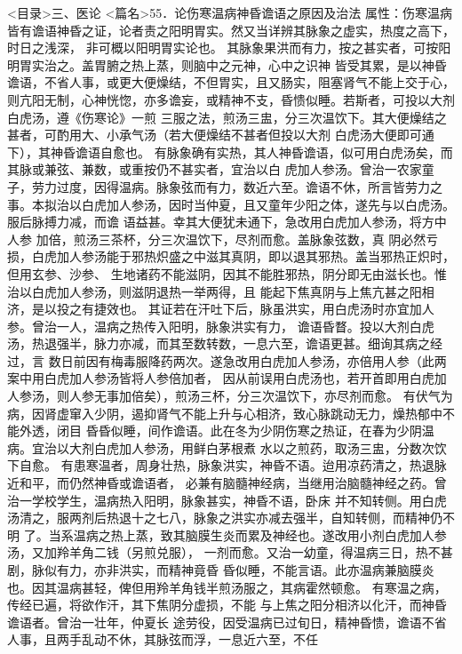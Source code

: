 \documentclass[a4paper,12pt,UTF8,twoside]{ctexbook}
\begin{document}
<目录>三、医论
<篇名>55．论伤寒温病神昏谵语之原因及治法
属性：伤寒温病皆有谵语神昏之证，论者责之阳明胃实。然又当详辨其脉象之虚实，热度之高下，时日之浅深， 
非可概以阳明胃实论也。 
其脉象果洪而有力，按之甚实者，可按阳明胃实治之。盖胃腑之热上蒸，则脑中之元神，心中之识神 
皆受其累，是以神昏谵语，不省人事，或更大便燥结，不但胃实，且又肠实，阻塞肾气不能上交于心， 
则亢阳无制，心神恍惚，亦多谵妄，或精神不支，昏愦似睡。若斯者，可投以大剂白虎汤，遵《伤寒论》一煎 
三服之法，煎汤三盅，分三次温饮下。其大便燥结之甚者，可酌用大、小承气汤（若大便燥结不甚者但投以大剂 
白虎汤大便即可通下），其神昏谵语自愈也。 
有脉象确有实热，其人神昏谵语，似可用白虎汤矣，而其脉或兼弦、兼数，或重按仍不甚实者，宜治以白 
虎加人参汤。曾治一农家童子，劳力过度，因得温病。脉象弦而有力，数近六至。谵语不休，所言皆劳力之 
事。本拟治以白虎加人参汤，因时当仲夏，且又童年少阳之体，遂先与以白虎汤。服后脉搏力减，而谵 
语益甚。幸其大便犹未通下，急改用白虎加人参汤，将方中人参 
加倍，煎汤三茶杯，分三次温饮下，尽剂而愈。盖脉象弦数，真 
阴必然亏损，白虎加人参汤能于邪热炽盛之中滋其真阴，即以退其邪热。盖当邪热正炽时，但用玄参、沙参、 
生地诸药不能滋阴，因其不能胜邪热，阴分即无由滋长也。惟治以白虎加人参汤，则滋阴退热一举两得，且 
能起下焦真阴与上焦亢甚之阳相济，是以投之有捷效也。 
其证若在汗吐下后，脉虽洪实，用白虎汤时亦宜加人参。曾治一人，温病之热传入阳明，脉象洪实有力， 
谵语昏瞀。投以大剂白虎汤，热退强半，脉力亦减，而其至数转数，一息六至，谵语更甚。细询其病之经过，言 
数日前因有梅毒服降药两次。遂急改用白虎加人参汤，亦倍用人参（此两案中用白虎加人参汤皆将人参倍加者， 
因从前误用白虎汤也，若开首即用白虎加人参汤，则人参无事加倍矣），煎汤三杯，分三次温饮下，亦尽剂而愈。 
有伏气为病，因肾虚窜入少阴，遏抑肾气不能上升与心相济，致心脉跳动无力，燥热郁中不能外透，闭目 
昏昏似睡，间作谵语。此在冬为少阴伤寒之热证，在春为少阴温病。宜治以大剂白虎加人参汤，用鲜白茅根煮 
水以之煎药，取汤三盅，分数次饮下自愈。 
有患寒温者，周身壮热，脉象洪实，神昏不语。迨用凉药清之，热退脉近和平，而仍然神昏或谵语者， 
必兼有脑髓神经病，当继用治脑髓神经之药。曾治一学校学生，温病热入阳明，脉象甚实，神昏不语，卧床 
并不知转侧。用白虎汤清之，服两剂后热退十之七八，脉象之洪实亦减去强半，自知转侧，而精神仍不明 
了。当系温病之热上蒸，致其脑膜生炎而累及神经也。遂改用小剂白虎加人参汤，又加羚羊角二钱（另煎兑服）， 
一剂而愈。又治一幼童，得温病三日，热不甚剧，脉似有力，亦非洪实，而精神竟昏 
昏似睡，不能言语。此亦温病兼脑膜炎也。因其温病甚轻，俾但用羚羊角钱半煎汤服之，其病霍然顿愈。 
有寒温之病，传经已遍，将欲作汗，其下焦阴分虚损，不能 
与上焦之阳分相济以化汗，而神昏谵语者。曾治一壮年，仲夏长 
途劳役，因受温病已过旬日，精神昏愦，谵语不省人事，且两手乱动不休，其脉弦而浮，一息近六至，不任 
\end{document}
